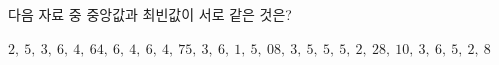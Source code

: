 다음 자료 중 중앙값과 최빈값이 서로 같은 것은?
\begin{choicesv}{$2,\ 5,\ 3,\ 6,\ 4,\ 6$}{$4,\ 6,\ 4,\ 6,\ 4,\ 7$}{$5,\ 3,\ 6,\ 1,\ 5,\ 0$}{$8,\ 3,\ 5,\ 5,\ 5,\ 2,\ 2$}{$8,\ 10,\ 3,\ 6,\ 5,\ 2,\ 8$}\end{choicesv}
